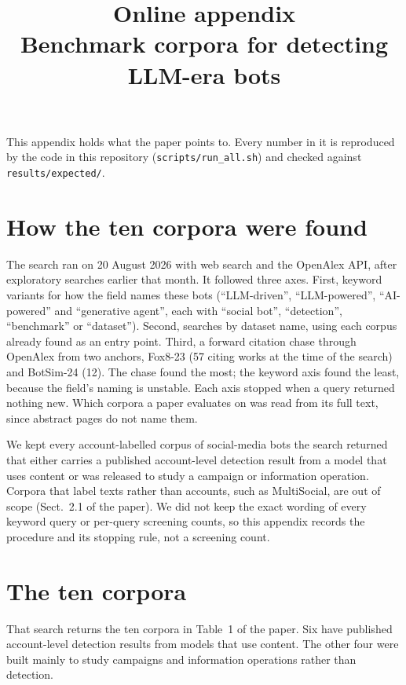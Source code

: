 \documentclass[10pt,a4paper]{article}
\title{Online appendix\\[3pt]\large Benchmark corpora for detecting LLM-era bots}
\author{}
\date{}
\begin{document}
\maketitle
\vspace{-2em}
This appendix holds what the paper points to. Every number in it is reproduced by the code in this
repository (\texttt{scripts/run\_all.sh}) and checked against \texttt{results/expected/}.

\section{How the ten corpora were found}\label{app:search}
The search ran on 20 August 2026 with web search and the OpenAlex API, after exploratory
  searches earlier that month.
It followed three axes.
First, keyword variants for how the field names these bots (``LLM-driven'', ``LLM-powered'',
  ``AI-powered'' and ``generative agent'', each with ``social bot'', ``detection'', ``benchmark''
  or ``dataset'').
Second, searches by dataset name, using each corpus already found as an entry point.
Third, a forward citation chase through OpenAlex from two anchors, Fox8-23 (57 citing works at
  the time of the search) and BotSim-24 (12).
The chase found the most; the keyword axis found the least, because the field's naming is
  unstable.
Each axis stopped when a query returned nothing new.
Which corpora a paper evaluates on was read from its full text, since abstract pages do not name
  them.

We kept every account-labelled corpus of social-media bots the search returned that either carries a
  published account-level detection result from a model that uses content or was released to
  study a campaign or information operation.
Corpora that label texts rather than accounts, such as MultiSocial, are out of scope
  (Sect.~2.1 of the paper).
We did not keep the exact wording of every keyword query or per-query screening counts, so this
  appendix records the procedure and its stopping rule, not a screening count.

\section{The ten corpora}\label{app:corpora}
That search returns the ten corpora in Table~1 of the paper.
Six have published account-level detection results from models that use content.
The other four were built mainly to study campaigns and information operations rather than
  detection.
\end{document}
